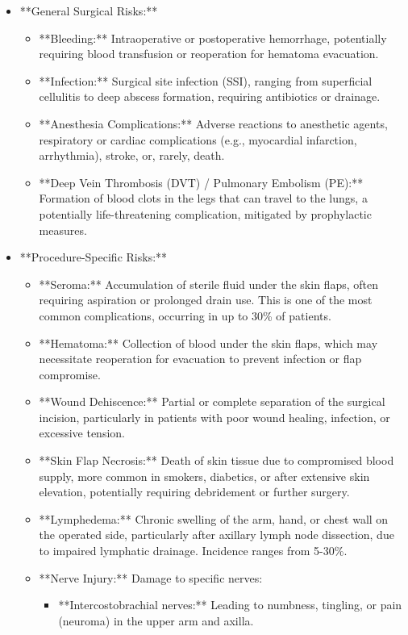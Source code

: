 \begin{itemize}
  \item **General Surgical Risks:**
    \begin{itemize}
      \item **Bleeding:** Intraoperative or postoperative hemorrhage, potentially requiring blood transfusion or reoperation for hematoma evacuation.
      \item **Infection:** Surgical site infection (SSI), ranging from superficial cellulitis to deep abscess formation, requiring antibiotics or drainage.
      \item **Anesthesia Complications:** Adverse reactions to anesthetic agents, respiratory or cardiac complications (e.g., myocardial infarction, arrhythmia), stroke, or, rarely, death.
      \item **Deep Vein Thrombosis (DVT) / Pulmonary Embolism (PE):** Formation of blood clots in the legs that can travel to the lungs, a potentially life-threatening complication, mitigated by prophylactic measures.
    \end{itemize}
  \item **Procedure-Specific Risks:**
    \begin{itemize}
      \item **Seroma:** Accumulation of sterile fluid under the skin flaps, often requiring aspiration or prolonged drain use. This is one of the most common complications, occurring in up to 30\% of patients.
      \item **Hematoma:** Collection of blood under the skin flaps, which may necessitate reoperation for evacuation to prevent infection or flap compromise.
      \item **Wound Dehiscence:** Partial or complete separation of the surgical incision, particularly in patients with poor wound healing, infection, or excessive tension.
      \item **Skin Flap Necrosis:** Death of skin tissue due to compromised blood supply, more common in smokers, diabetics, or after extensive skin elevation, potentially requiring debridement or further surgery.
      \item **Lymphedema:** Chronic swelling of the arm, hand, or chest wall on the operated side, particularly after axillary lymph node dissection, due to impaired lymphatic drainage. Incidence ranges from 5-30\%.
      \item **Nerve Injury:** Damage to specific nerves:
        \begin{itemize}
          \item **Intercostobrachial nerves:** Leading to numbness, tingling, or pain (neuroma) in the upper arm and axilla.

\end{itemize}
\end{itemize}
\end{itemize}
